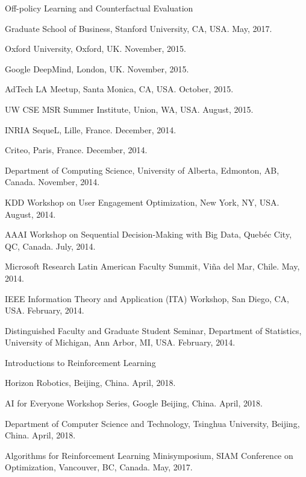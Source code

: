 \documentclass[10pt,twoside,letterpaper]{article}
\begin{document}
\begin{compactitem}
\item{Off-policy Learning and Counterfactual Evaluation}
\begin{compactitem}
\item{Graduate School of Business, Stanford University, CA, USA.  May, 2017.}
\item{Oxford University, Oxford, UK. November, 2015.}
\item{Google DeepMind, London, UK. November, 2015.}
\item{AdTech LA Meetup, Santa Monica, CA, USA. October, 2015.}
\item{UW CSE MSR Summer Institute, Union, WA, USA. August, 2015.}
\item{INRIA SequeL, Lille, France. December, 2014.}
\item{Criteo, Paris, France. December, 2014.}
\item{Department of Computing Science, University of Alberta, Edmonton, AB, Canada.  November, 2014.}
\item{KDD Workshop on User Engagement Optimization, New York, NY, USA.  August, 2014.}
\item{AAAI Workshop on Sequential Decision-Making with Big Data, Queb{\'e}c City, QC, Canada. July, 2014.}
\item{Microsoft Research Latin American Faculty Summit, Vi\~na del Mar, Chile. May, 2014.}
\item{IEEE Information Theory and Application (ITA) Workshop, San Diego, CA, USA.  February, 2014.}
\item{Distinguished Faculty and Graduate Student Seminar, Department of Statistics, University of Michigan, Ann Arbor, MI, USA.  February, 2014.}
\end{compactitem}

\item{Introductions to Reinforcement Learning}
\begin{compactitem}
\item{Horizon Robotics, Beijing, China.  April, 2018.}
\item{AI for Everyone Workshop Series, Google Beijing, China.  April, 2018.}
\item{Department of Computer Science and Technology, Tsinghua University, Beijing, China.  April, 2018.}
\item{Algorithms for Reinforcement Learning Minisymposium, SIAM Conference on Optimization, Vancouver, BC, Canada.  May, 2017.}
\end{compactitem}


\end{compactitem}
\end{document}
